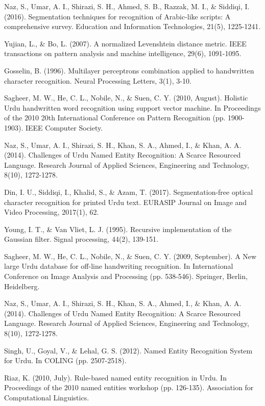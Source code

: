 \begin{thebibliography}{130}
Naz, S., Umar, A. I., Shirazi, S. H., Ahmed, S. B., Razzak, M. I., \& Siddiqi, I. (2016). Segmentation techniques for recognition of Arabic-like scripts: A comprehensive survey. Education and Information Technologies, 21(5), 1225-1241.

Yujian, L., \& Bo, L. (2007). A normalized Levenshtein distance metric. IEEE transactions on pattern analysis and machine intelligence, 29(6), 1091-1095.

Gosselin, B. (1996). Multilayer perceptrons combination applied to handwritten character recognition. Neural Processing Letters, 3(1), 3-10.

Sagheer, M. W., He, C. L., Nobile, N., \& Suen, C. Y. (2010, August). Holistic Urdu handwritten word recognition using support vector machine. In Proceedings of the 2010 20th International Conference on Pattern Recognition (pp. 1900-1903). IEEE Computer Society.

Naz, S., Umar, A. I., Shirazi, S. H., Khan, S. A., Ahmed, I., \& Khan, A. A. (2014). Challenges of Urdu Named Entity Recognition: A Scarce Resourced Language. Research Journal of Applied Sciences, Engineering and Technology, 8(10), 1272-1278.

Din, I. U., Siddiqi, I., Khalid, S., \& Azam, T. (2017). Segmentation-free optical character recognition for printed Urdu text. EURASIP Journal on Image and Video Processing, 2017(1), 62.

Young, I. T., \& Van Vliet, L. J. (1995). Recursive implementation of the Gaussian filter. Signal processing, 44(2), 139-151.

Sagheer, M. W., He, C. L., Nobile, N., \& Suen, C. Y. (2009, September). A New large Urdu database for off-line handwriting recognition. In International Conference on Image Analysis and Processing (pp. 538-546). Springer, Berlin, Heidelberg.

Naz, S., Umar, A. I., Shirazi, S. H., Khan, S. A., Ahmed, I., \& Khan, A. A. (2014). Challenges of Urdu Named Entity Recognition: A Scarce Resourced Language. Research Journal of Applied Sciences, Engineering and Technology, 8(10), 1272-1278.

Singh, U., Goyal, V., \& Lehal, G. S. (2012). Named Entity Recognition System for Urdu. In COLING (pp. 2507-2518).

Riaz, K. (2010, July). Rule-based named entity recognition in Urdu. In Proceedings of the 2010 named entities workshop (pp. 126-135). Association for Computational Linguistics.


\end{thebibliography}
